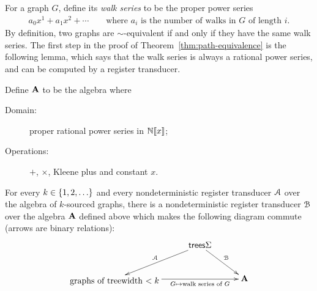 For a graph $G$, define its \emph{walk series} to be the proper power series 
\begin{align*}
  a_0 x^1 + a_1 x^2 + \cdots \qquad \text{where $a_i$ is the number of walks in $G$ of length $i$.}
\end{align*}
By definition, two graphs are $\sim$-equivalent if and only if they have the same walk series. 
The first step in the proof of Theorem~\ref{thm:path-equivalence} is the following lemma, which says that the walk series is always a  rational power series, and can be computed by a register transducer.
\begin{lemma}\label{lem:compute-power-series}    
    Define  $\mathbf{A}$ to be the  algebra where
    \begin{description}
        \item[Domain:] proper rational power series in $\mathbb N [\![x]\!]$;
        \item[Operations:] $+$, $\times$, Kleene plus and constant $x$.
    \end{description}
    For every $k \in \{1,2,\ldots\}$ and every nondeterministic register transducer ${{\mathcal A}}$ over the algebra of $k$-sourced graphs, there is a  nondeterministic register transducer ${\mathcal B}$ over the algebra  $\mathbf{A}$ defined above which makes the following diagram commute (arrows are binary relations):
    \begin{align*}
    \xymatrix@C=1cm{
       &  \trees \Sigma   
        \ar[dr]^{\Bb}
        \ar[dl]_{\Aa} \\
        \txt{graphs of
        treewidth $< k$} \ar[rr]_-{G \mapsto \text{walk series of $G$}}& & \aalg
    }
    \end{align*}
\end{lemma}
